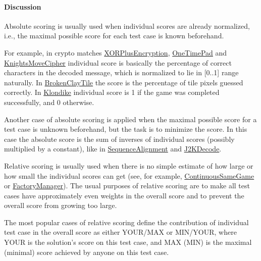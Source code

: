 \documentclass[]{article}
\let\oldparagraph\paragraph
\renewcommand{\paragraph}[1]{\oldparagraph{#1}\mbox{}}
\begin{document}
\hypertarget{discussion-3}{%
\paragraph{Discussion}\label{discussion-3}}

Absolute scoring is usually used when individual scores are already
normalized, i.e., the maximal possible score for each test case is known
beforehand.

For example, in crypto matches
\href{http://community.topcoder.com/longcontest/?module=ViewProblemStatement\&rd=12202\&pm=9798}{XORPlusEncryption},
\href{http://community.topcoder.com/longcontest/?module=ViewProblemStatement\&rd=13564\&pm=9906}{OneTimePad}
and
\href{http://community.topcoder.com/longcontest/?module=ViewProblemStatement\&rd=13679\&pm=10242}{KnightsMoveCipher}
individual score is basically the percentage of correct characters in
the decoded message, which is normalized to lie in {[}0..1{]} range
naturally. In
\href{http://community.topcoder.com/longcontest/?module=ViewProblemStatement\&rd=14209\&pm=10756}{BrokenClayTile}
the score is the percentage of tile pixels guessed correctly. In
\href{http://community.topcoder.com/longcontest/?module=ViewProblemStatement\&rd=13565\&pm=10014}{Klondike}
individual score is 1 if the game was completed successfully, and 0
otherwise.

Another case of absolute scoring is applied when the maximal possible
score for a test case is unknown beforehand, but the task is to minimize
the score. In this case the absolute score is the sum of inverses of
individual scores (possibly multiplied by a constant), like in
\href{http://community.topcoder.com/longcontest/?module=ViewProblemStatement\&rd=13797\&pm=10390}{SequenceAlignment}
and
\href{http://community.topcoder.com/longcontest/?module=ViewProblemStatement\&rd=13772\&pm=10328}{J2KDecode}.

Relative scoring is usually used when there is no simple estimate of how
large or how small the individual scores can get (see, for example,
\href{http://community.topcoder.com/longcontest/?module=ViewProblemStatement\&rd=10815\&pm=7789}{ContinuousSameGame}
or
\href{http://community.topcoder.com/longcontest/?module=ViewProblemStatement\&rd=12198\&pm=8472}{FactoryManager}).
The usual purposes of relative scoring are to make all test cases have
approximately even weights in the overall score and to prevent the
overall score from growing too large.

The most popular cases of relative scoring define the contribution of
individual test case in the overall score as either YOUR/MAX or
MIN/YOUR, where YOUR is the solution's score on this test case, and MAX
(MIN) is the maximal (minimal) score achieved by anyone on this test
case.
\end{document}
